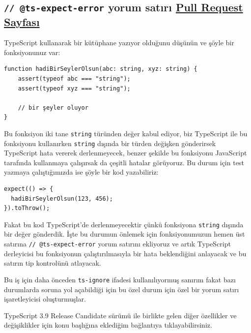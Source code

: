 \documentclass[11pt]{article}
\begin{document}
\subsection{\texttt{// @ts-expect-error} yorum satırı \href{https://github.com/microsoft/TypeScript/pull/36014}{Pull Request Sayfası}}
\label{sec:org8729864}
TypeScript kullanarak bir kütüphane yazıyor olduğunu düşünün ve şöyle bir
fonksiyonunuz var:

\begin{verbatim}
function hadiBirSeylerOlsun(abc: string, xyz: string) {
    assert(typeof abc === "string");
    assert(typeof xyz === "string");

    // bir şeyler oluyor
}
\end{verbatim}
Bu fonksiyon iki tane \texttt{string} türünden değer kabul ediyor, biz TypeScript
ile bu fonksiyonu kullanırken \texttt{string} dışında bir türden değişken
gönderirsek TypeScript hata vererek derlenmeyecek, benzer şekilde bu
fonksiyonu JavaScript tarafında kullanmaya çalışırsak da çeşitli hatalar
görüyoruz. Bu durum için test yazmaya çalıştığımızda ise şöyle bir kod
yazabiliriz:
\begin{verbatim}
expect(() => {
  hadiBirSeylerOlsun(123, 456);
}).toThrow();
\end{verbatim}
Fakat bu kod TypeScript'de derlenmeyecektir çünkü fonksiyona \texttt{string} dışında
bir değer gönderdik. İşte bu durumun önlemek için fonksiyonumuzun hemen üst
satırına \texttt{// @ts-expect-error} yorum satırını ekliyoruz ve artık TypeScript
derleyicisi bu fonksiyonun çalıştırılmasıyla bir hata beklendiğini anlayacak
ve bu satırın tip kontrolünü atlayacak.

Bu iş için daha önceden \texttt{ts-ignore} ifadesi kullanılıyormuş sanırım fakat
bazı durumlarda soruna yol açabildiği için bu özel durum için özel bir yorum
satırı işaretleyicisi oluşturmuşlar.

TypeScript 3.9 Release Candidate sürümü ile birlikte gelen diğer özellikler ve
değişiklikler için konu başlığına eklediğim bağlantıya tıklayabilirsiniz.
\end{document}
